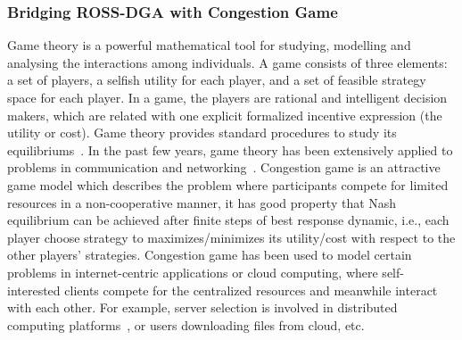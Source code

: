 \documentclass[10pt,journal,compsoc]{IEEEtran}
\theoremstyle{mytheoremstyle}
\theoremstyle{mytheoremstyle}
\theoremstyle{mytheoremstyle}
\newcommand{\ie}{i.e., }
\begin{document}
\subsubsection{Bridging ROSS-DGA with Congestion Game}
\label{clustering:phaseII:game}
Game theory is a powerful mathematical tool for studying, modelling and analysing the interactions among individuals.
A game consists of three elements: a set of players, a selfish utility for each player, and a set of feasible strategy space for each player. In a game, the players are rational and intelligent decision makers, which are related with one explicit formalized incentive expression (the utility or cost).
Game theory provides standard procedures to study its equilibriums~\cite{game_for_communication_01}.
In the past few years, game theory has been extensively applied to problems in communication and networking~\cite{Neel06analysisand, Wang_gtc_crn_survey_2010}.
Congestion game is an attractive game model which describes the problem where participants compete for limited resources in a non-cooperative manner, it has good property that Nash equilibrium can be achieved after finite steps of best response dynamic, \ie each player choose strategy to maximizes/minimizes its utility/cost with respect to the other players' strategies.
Congestion game has been used to model certain problems in internet-centric applications or cloud computing, where self-interested clients compete for the centralized resources and meanwhile interact with each other.
For example, server selection is involved in distributed computing platforms~\cite{Cloud_Computing_2010}, or users downloading files from cloud, etc.
\end{document}
